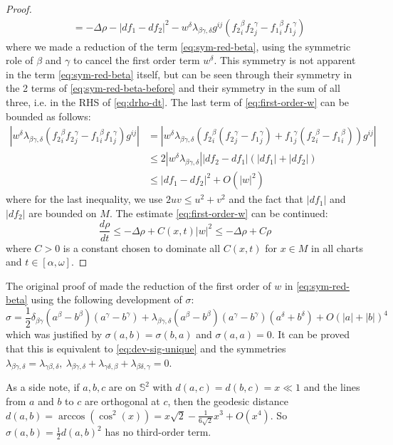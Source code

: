 \begin{proof}
\begin{align}
		   & = -\Delta \rho - |df_1 -df_2|^2 - w^\delta \lambda_{\beta\gamma,\delta}g^{ij}\left(  {f_2}^\beta_i {f_2}^\gamma_j - {f_1}^\beta_i {f_1}^\gamma_j  \right) \label{eq:first-order-w}
\end{align}
where we made a reduction of the term \eqref{eq:sym-red-beta}, using the symmetric role of \(\beta\) and
\(\gamma\) to cancel the first order term \(w^\delta\). This symmetry is not apparent
in the term \eqref{eq:sym-red-beta} itself, but can be seen through their symmetry in the
2 terms of \eqref{eq:sym-red-beta-before} and their symmetry in the sum of all three,
i.e. in the RHS of \eqref{eq:drho-dt}. The last term of \eqref{eq:first-order-w} can be bounded as follows:
\begin{align*}
    \left | w^\delta \lambda_{\beta\gamma,\delta}\left({f_2}^\beta_i {f_2}^\gamma_j -
{f_1}^\beta_i {f_1}^\gamma_j\right) g^{ij} \right| &=   \left | w^\delta \lambda_{\beta\gamma,\delta}\left({f_2}^\beta_i ({f_2}^\gamma_j - {f_1}^\gamma_j) + {f_1}^\gamma_j({f_2}^\beta_i -
{f_1}^\beta_i) \right) g^{ij} \right| \\
	       &\leq 2 |w^\delta \lambda_{\beta\gamma,\delta}| |df_2 -df_1| (|df_1| + |df_2|)\\
	       &\leq |df_1 - df_2|^2 + O(|w|^2)
\end{align*}
where for the last inequality, we use \(2uv \leq u^2 + v^2\) and the fact that \(|df_1|\) and \(|df_2|\) are bounded on \(M\). The estimate \eqref{eq:first-order-w} can be
continued:
\[
 \frac{d \rho}{d t}\leq -\Delta\rho + C(x,t) |w|^2 \leq -\Delta \rho + C \rho
\]
where \(C >0\) is a constant chosen to dominate all \(C(x,t)\) for \(x\in M\) in all
charts and \(t\in [\alpha,\omega]\).
\end{proof}

\begin{remark}
\label{rem:hamilton-alg-rig}
The original proof of \cite{hamilton_harmonic_1975}
made the reduction of the first order of \(w\) in \eqref{eq:sym-red-beta} using
the following development of \(\sigma\):
\[
 \sigma = \frac{1}{2}\delta_{\beta\gamma} (a^\beta - b^\beta)(a^\gamma - b^\gamma) +
\lambda_{\beta\gamma,\delta} (a^\beta - b^\beta)(a^\gamma -b^\gamma)(a^\delta + b^\delta) + O(|a|+|b|)^4
\]
which was justified by \(\sigma(a,b) = \sigma(b,a)\) and \(\sigma(a,a)=0\). It can be proved that this is equivalent to \eqref{eq:dev-sig-unique} and the symmetries \(\lambda_{\beta\gamma,\delta} =
\lambda_{\gamma\beta,\delta},\ \lambda_{\beta\gamma,\delta}
+\lambda_{\gamma\delta,\beta} + \lambda_{\beta\delta,\gamma}= 0\).

As a side note, if \(a,b,c\) are on \(\mathbb{S}^2\) with \(d(a,c) = d(b,c) = x \ll 1\)
and the lines from \(a\) and \(b\) to \(c\) are orthogonal at \(c\), then the
geodesic distance \(d(a,b) = \arccos(\cos^2(x)) = x\sqrt{2} - \frac{1}{6\sqrt{2}}x^3 +
O(x^4)\). So \(\sigma(a,b) = \frac{1}{2}d(a,b)^2\) has no third-order term.
\end{remark}

